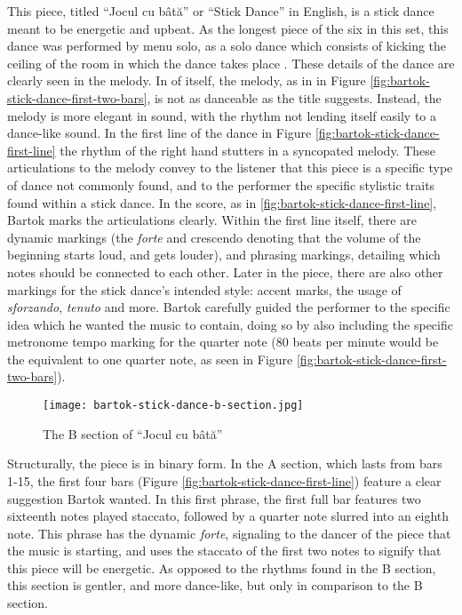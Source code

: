 This piece, titled ``Jocul cu bâtă'' or ``Stick Dance'' in English, is a stick dance meant to be energetic and upbeat. As the longest piece of the six in this set, this dance was performed by menu solo, as a solo dance which consists of kicking the ceiling of the room in which the dance takes place \autocite{Weissmann_1969}. These details of the dance are clearly seen in the melody. In of itself, the melody, as in  in Figure \ref{fig:bartok-stick-dance-first-two-bars}\autocite{Lung_2016}, is not as danceable as the title suggests. Instead, the melody is more elegant in sound, with the rhythm not lending itself easily to a dance-like sound. In the first line of the dance in Figure \ref{fig:bartok-stick-dance-first-line}\autocite{Lung_2016} the rhythm of the right hand stutters in a syncopated melody. These articulations to the melody convey to the listener that this piece is a specific type of dance not commonly found, and to the performer the specific stylistic traits found within a stick dance. In the score, as in \ref{fig:bartok-stick-dance-first-line}\autocite{Lung_2016}, Bartok marks the articulations clearly. Within the first line itself, there are dynamic markings (the \textit{forte} and crescendo denoting that the volume of the beginning starts loud, and gets louder), and phrasing markings, detailing which notes should be connected to each other. Later in the piece, there are also other markings for the stick dance's intended style: accent marks, the usage of \textit{sforzando}, \textit{tenuto} and more. Bartok carefully guided the performer to the specific idea which he wanted the music to contain, doing so by also including the specific metronome tempo marking for the quarter note (80 beats per minute would be the equivalent to one quarter note, as seen in Figure \ref{fig:bartok-stick-dance-first-two-bars}\autocite{Lung_2016}).

\begin{figure}
  \centering
  \texttt{[image: bartok-stick-dance-b-section.jpg]}
  \caption[The B Section, of ``Jocul cu bâtă'' in Bartok's \textit{Romanian Folk Dances, Sz. 56, BB 68}]{The B section of ``Jocul cu bâtă''}
  \label{fig:bartok-b-section}
\end{figure}


Structurally, the piece is in binary form. In the A section, which lasts from bars 1-15, the first four bars (Figure \ref{fig:bartok-stick-dance-first-line}\autocite{Lung_2016}) feature a clear suggestion Bartok wanted. In this first phrase, the first full bar features two sixteenth notes played staccato, followed by a quarter note slurred into an eighth note. This phrase has the dynamic \textit{forte}, signaling to the dancer of the piece that the music is starting, and uses the staccato of the first two notes to signify that this piece will be energetic. As opposed to the rhythms found in the B section, this section is gentler, and more dance-like, but only in comparison to the B section. 

